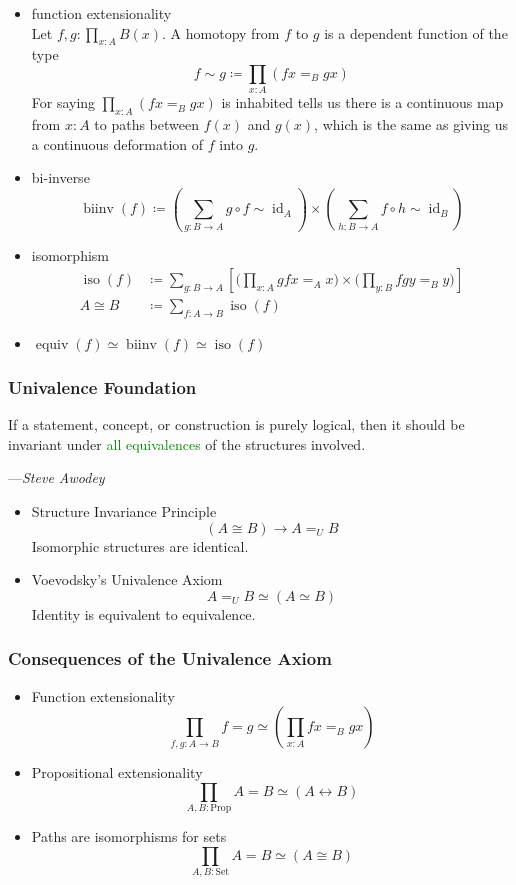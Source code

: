 \documentclass[UTF8,11pt,colorlinks,compress,openany]{beamer}%
\begin{document}
\begin{frame}\frametitle{}
\begin{itemize}
 	\item function extensionality\\
 	Let $f,g:\prod_{x:A}B(x)$. A homotopy from $f$ to $g$ is a dependent function of the type
 	\[f\sim g\coloneqq\prod_{x:A}(fx=_Bgx)\]
 	For saying $\prod_{x:A}(fx=_Bgx)$ is inhabited tells us there is a continuous map from $x:A$ to paths between $f(x)$ and $g(x)$, which is the same as giving us a continuous deformation of $f$ into $g$.
 	\item bi-inverse
 	\[\operatorname{biinv}(f)\coloneqq\left(\sum\limits_{g:B\to A}g\circ f\sim \operatorname{id}_A\right)\times\left(\sum\limits_{h:B\to A}f\circ h\sim \operatorname{id}_B\right)\]
 	\item isomorphism
 	\begin{align*}
 	\operatorname{iso}(f)&\coloneqq\sum_{g:B\to A}\left[\bigg(\prod_{x:A} gfx=_Ax\bigg)\times\bigg(\prod_{y:B} fgy=_By\bigg)\right]\\
 	A\cong B&\coloneqq\sum_{f:A\to B}\operatorname{iso}(f)
 	\end{align*}
 	\item $\operatorname{equiv}(f)\simeq \operatorname{biinv}(f)\simeq \operatorname{iso}(f)$
 \end{itemize}
\end{frame}

\begin{frame}\frametitle{Univalence Foundation}
If a statement, concept, or construction is purely logical, then it should be invariant under \textcolor{green}{all equivalences} of the structures involved.\par\hfill---\textsl{Steve Awodey}
\begin{itemize}
	\item Structure Invariance Principle
	\[(A\cong B)\to A=_UB\]
	Isomorphic structures are identical.
	\item Voevodsky's Univalence Axiom
	\[A=_UB\simeq (A\simeq B)\]
	Identity is equivalent to equivalence.
\end{itemize}
\end{frame}

\begin{frame}\frametitle{Consequences of the Univalence Axiom}
\begin{itemize}
	\item Function extensionality
	\[\prod_{f,g:A\to B}f=g\simeq\left(\prod_{x:A}fx=_Bgx\right)\]
	\item Propositional extensionality
	\[\prod_{A,B:\mathrm{Prop}}A=B\simeq (A\leftrightarrow B)\]
	\item Paths are isomorphisms for sets
	\[\prod_{A,B:\mathrm{Set}}A=B\simeq(A\cong B)\]
\end{itemize}
\end{frame}
\end{document}

